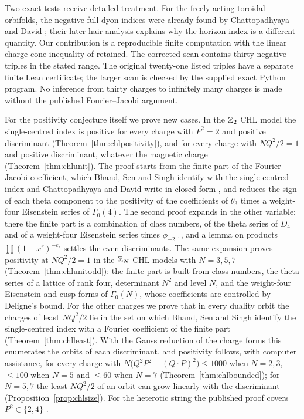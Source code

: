Two exact tests receive detailed treatment. For the freely acting toroidal orbifolds, the negative full dyon indices were already found by Chattopadhyaya and David \cite{CD19}; their later hair analysis \cite{CD21} explains why the horizon index is a different quantity. Our contribution is a reproducible finite computation with the linear charge-cone inequality of \cite[Eq.~(3.9)]{Sen11positivity} retained. The corrected scan contains thirty negative triples in the stated range. The original twenty-one listed triples have a separate finite Lean certificate; the larger scan is checked by the supplied exact Python program. No inference from thirty charges to infinitely many charges is made without the published Fourier--Jacobi argument.

For the positivity conjecture itself we prove new cases. In the $\mathbb{Z}_2$ CHL model the single-centred index is positive for every charge with $P^2=2$ and positive discriminant (Theorem~\ref{thm:chlpositivity}), and for every charge with $NQ^2/2=1$ and positive discriminant, whatever the magnetic charge (Theorem~\ref{thm:chlunit}). The proof starts from the finite part of the Fourier--Jacobi coefficient, which Bhand, Sen and Singh identify with the single-centred index \cite{BSS25} and Chattopadhyaya and David write in closed form \cite{CD19}, and reduces the sign of each theta component to the positivity of the coefficients of $\theta_3$ times a weight-four Eisenstein series of $\Gamma_0(4)$. The second proof expands in the other variable: there the finite part is a combination of class numbers, of the theta series of $D_4$ and of a weight-four Eisenstein series times $\phi_{-2,1}$, and a lemma on products $\prod(1-x^r)^{-e_r}$ settles the even discriminants. The same expansion proves positivity at $NQ^2/2=1$ in the $\mathbb{Z}_N$ CHL models with $N=3,5,7$ (Theorem~\ref{thm:chlunitodd}): the finite part is built from class numbers, the theta series of a lattice of rank four, determinant $N^2$ and level $N$, and the weight-four Eisenstein and cusp forms of $\Gamma_0(N)$, whose coefficients are controlled by Deligne's bound. For the other charges we prove that in every duality orbit the charges of least $NQ^2/2$ lie in the set on which Bhand, Sen and Singh identify the single-centred index with a Fourier coefficient of the finite part (Theorem~\ref{thm:chlleast}). With the Gauss reduction of the charge forms this enumerates the orbits of each discriminant, and positivity follows, with computer assistance, for every charge with $N\big(Q^2P^2-(Q\cdot P)^2\big)\le1000$ when $N=2,3$, $\le100$ when $N=5$ and $\le60$ when $N=7$ (Theorem~\ref{thm:chlbounded}); for $N=5,7$ the least $NQ^2/2$ of an orbit can grow linearly with the discriminant (Proposition~\ref{prop:chlsize}). For the heterotic string the published proof covers $P^2\in\{2,4\}$ \cite{BringmannMurthy13}.

